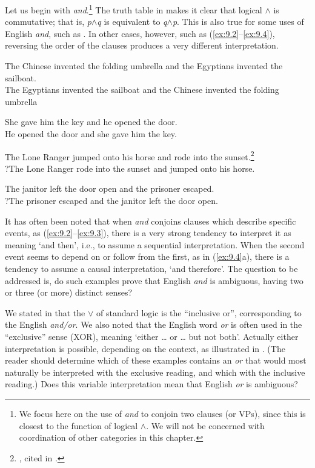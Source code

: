 Let us begin with \textit{and}.\footnote{We focus here on the use of \textit{and} to conjoin two clauses (or VPs), since this is closest to the function of logical $\wedge$. We will not be concerned with coordination of other categories in this chapter.} The truth table in  makes it clear that logical $\wedge$ is commutative; that is, \textit{p$\wedge$}\textit{q} is equivalent to \textit{q$\wedge$}\textit{p}. This is also true for some uses of English \textit{and}, such as . In other cases, however, such as (\ref{ex:9.2}--\ref{ex:9.4}), reversing the order of the clauses produces a very different interpretation.


\ea \label{ex:9.1}
\ea The Chinese invented the folding umbrella and the Egyptians invented the sailboat.\\
\ex The Egyptians invented the sailboat and the Chinese invented the folding umbrella
                       \z
\z

\ea \label{ex:9.2}
\ea She gave him the key and he opened the door.\\
\ex He opened the door and she gave him the key.
                       \z
\z

\ea \label{ex:9.3}
\ea The Lone Ranger jumped onto his horse and rode into the sunset.\footnote{\citet[56]{Kempson1975}, cited in \citet{Gazdar1979}.}\\
\ex ?The Lone Ranger rode into the sunset and jumped onto his horse.
                       \z
\z

\ea \label{ex:9.4}
\ea The janitor left the door open and the prisoner escaped.\\
\ex ?The prisoner escaped and the janitor left the door open.
                       \z
\z


It has often been noted that when \textit{and} conjoins clauses which describe specific events, as (\ref{ex:9.2}--\ref{ex:9.3}), there is a very strong tendency to interpret it as meaning ‘and then’, i.e., to assume a sequential interpretation. When the second event seems to depend on or follow from the first, as in (\ref{ex:9.4}a), there is a tendency to assume a causal interpretation, ‘and therefore’. The question to be addressed is, do such examples prove that English \textit{and} is ambiguous, having two or three (or more) distinct senses?



We stated in  that the $\vee$ of standard logic is the “inclusive or”, corresponding to the English \textit{and/or}. We also noted that the English word \textit{or} is often used in the “exclusive” sense (XOR), meaning ‘either … or … but not both’. Actually either interpretation is possible, depending on the context, as illustrated in . (The reader should determine which of these examples contains an \textit{or} that would most naturally be interpreted with the exclusive reading, and which with the inclusive reading.) Does this variable interpretation mean that English \textit{or} is ambiguous? 


